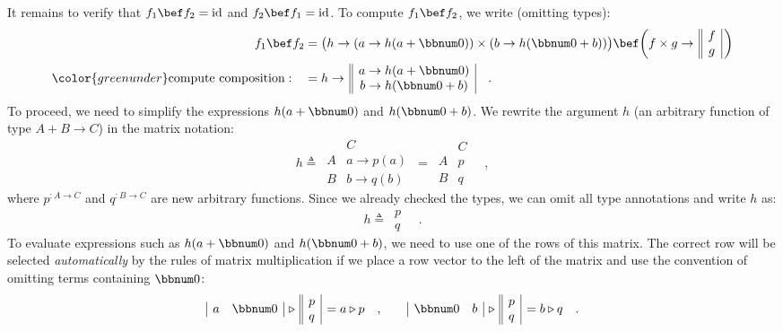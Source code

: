 It remains to verify that $f_{1}\bef f_{2}=\text{id}$ and $f_{2}\bef f_{1}=\text{id}$.
To compute $f_{1}\bef f_{2}$, we write (omitting types):
\begin{align*}
f_{1}\bef f_{2} & =\big(h\rightarrow(a\rightarrow h(a+\bbnum 0))\times(b\rightarrow h(\bbnum 0+b))\big)\bef\bigg(f\times g\rightarrow\,\begin{array}{||c|}
f\\
g
\end{array}\,\bigg)\\
{\color{greenunder}\text{compute composition}:}\quad & =h\rightarrow\,\begin{array}{||c|}
a\rightarrow h(a+\bbnum 0)\\
b\rightarrow h(\bbnum 0+b)
\end{array}\quad.
\end{align*}
To proceed, we need to simplify the expressions $h(a+\bbnum 0)$ and
$h(\bbnum 0+b)$. We rewrite the argument $h$ (an arbitrary function
of type $A+B\rightarrow C$) in the matrix notation:
\[
h\triangleq\,\begin{array}{|c||c|}
 & C\\
\hline A & a\rightarrow p(a)\\
B & b\rightarrow q(b)
\end{array}\,=\,\begin{array}{|c||c|}
 & C\\
\hline A & p\\
B & q
\end{array}\quad,
\]
where $p^{:A\rightarrow C}$ and $q^{:B\rightarrow C}$ are new arbitrary
functions. Since we already checked the types, we can omit all type
annotations and write $h$ as:
\[
h\triangleq\,\begin{array}{||c|}
p\\
q
\end{array}\quad.
\]
To evaluate expressions such as $h(a+\bbnum 0)$ and $h(\bbnum 0+b)$,
we need to use one of the rows of this matrix. The correct row will
be selected \emph{automatically} by the rules of matrix multiplication
if we place a row vector to the left of the matrix and use the convention
of omitting terms containing $\bbnum 0$:
\[
\begin{array}{|cc|}
a & \bbnum 0\end{array}\,\triangleright\,\begin{array}{||c|}
p\\
q
\end{array}\,=a\triangleright p\quad,\quad\quad\begin{array}{|cc|}
\bbnum 0 & b\end{array}\,\triangleright\,\begin{array}{||c|}
p\\
q
\end{array}\,=b\triangleright q\quad.
\]
